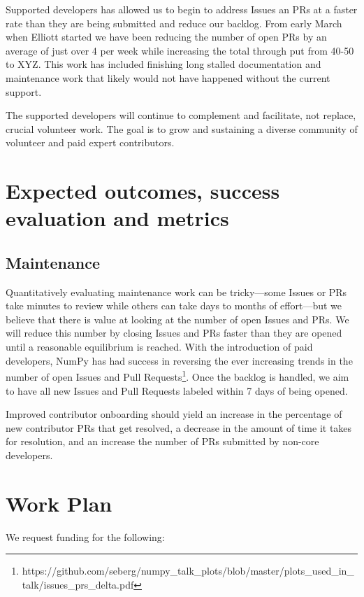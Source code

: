 \documentclass[12pt,letterpaper]{article}  %
\begin{document}
Supported developers has allowed us to begin to address Issues an PRs
at a faster rate than they are being submitted and reduce our backlog.
From early March when Elliott started we have been reducing the number
of open PRs by an average of just over 4 per week while increasing the
total through put from 40-50 to XYZ.  This work has included finishing
long stalled documentation and maintenance work that likely would not
have happened without the current support.

The supported developers will continue to complement and facilitate,
not replace, crucial volunteer work.  The goal is to grow and
sustaining a diverse community of volunteer and paid expert
contributors.


\section{Expected outcomes, success evaluation and metrics}
\subsection{Maintenance}

Quantitatively evaluating maintenance work can be tricky---some Issues
or PRs take minutes to review while others can take days to months of
effort---but we believe that there is value at looking at the number
of open Issues and PRs.  We will reduce this number by closing Issues
and PRs faster than they are opened until a reasonable equilibrium is
reached. With the introduction of paid developers, NumPy has had
success in reversing the ever increasing trends in the number of open
Issues and Pull
Requests\footnote{https://github.com/seberg/numpy\_talk\_plots/blob/master/plots\_used\_in\_talk/issues\_prs\_delta.pdf}. Once
the backlog is handled, we aim to have all new Issues and Pull
Requests labeled within 7 days of being opened.

Improved contributor onboarding should yield an increase in the
percentage of new contributor PRs that get resolved, a decrease in the
amount of time it takes for resolution, and an increase the number of
PRs submitted by non-core developers.


\section{Work Plan}

We request funding for the following:
\end{document}
